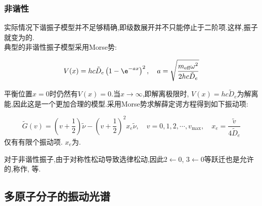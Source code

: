 \documentclass{ctexbook}
\begin{document}
\subsubsection{非谐性}
实际情况下谐振子模型并不足够精确,即级数展开并不只能停止于二阶项.这样,振子就变为的.\\
\indent 典型的非谐性振子模型采用Morse势:
\begin{definition}[Morse势]
    \[V(x)=hc\tilde{D}_e\left(1-\e^{-ax}\right)^2,\quad a=\sqrt{\dfrac{m_{\text{eff}}\omega^2}{2hc\tilde{D}_e}}\]
\end{definition}
平衡位置$x=0$时仍然有$V(x)=0$.当$x\to\infty$,即解离极限时, $V(x)=hc\tilde{D}_e$为解离能,因此这是一个更加合理的模型.采用Morse势求解薛定谔方程得到如下振动项:
\begin{theorem}[Morse势的振动项]
    \[\tilde{G}(v)=\left(v+\dfrac12\right)\tilde{\nu}-\left(v+\dfrac12\right)^2x_e\tilde{\nu},\quad v=0,1,2,\cdots,v_{\max},\quad x_e=\dfrac{\tilde{v}}{4\tilde{D}_e}\]
    仅有有限个振动项. $x_e$为.
\end{theorem}
对于非谐性振子,由于对称性松动导致选律松动,因此$2\leftarrow0$, $3\leftarrow0$等跃迁也是允许的,称作, 等.
\subsection{多原子分子的振动光谱}
\end{document}
